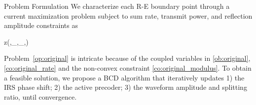 \documentclass[journal]{IEEEtran}
\begin{document}
	\begin{section}{Problem Formulation}\label{se:problem_formulation}
		We characterize each R-E boundary point through a current maximization problem subject to sum rate, transmit power, and reflection amplitude constraints as
		\begin{maxi!}
			{}{z(\boldsymbol{\phi},_{},_{},\rho)}{\label{op:original}}{\label{ob:original}}
			\label{co:original_rate}
			\label{co:original_power}
			\label{co:original_modulus}
		\end{maxi!}
		Problem~\eqref{op:original} is intricate because of the coupled variables in \eqref{ob:original}, \eqref{co:original_rate} and the non-convex constraint \eqref{co:original_modulus}. To obtain a feasible solution, we propose a BCD algorithm that iteratively updates 1) the IRS phase shift; 2) the active precoder; 3) the waveform amplitude and splitting ratio, until convergence.



\end{section}
\end{document}
